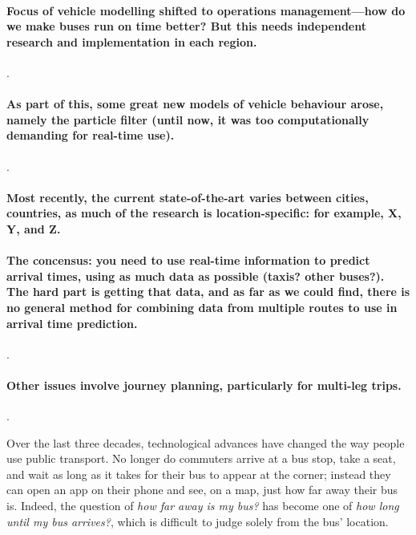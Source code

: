 \paragraph{Focus of vehicle modelling shifted to operations management---how do we make buses run on time better? But this needs independent research and implementation in each region.}
\citet{Wessel_2016, Hans_2015}.


\paragraph{As part of this, some great new models of vehicle behaviour arose, namely the particle filter (until now, it was too computationally demanding for real-time use).}
\citet{Hans_2015b,Chen_2014}.


\paragraph{Most recently, the current state-of-the-art varies between cities, countries, as much of the research is location-specific: for example, X, Y, and Z.}


\paragraph{The concensus: you need to use real-time information to predict arrival times, using as much data as possible (taxis? other buses?). The hard part is getting that data, and as far as we could find, there is no general method for combining data from multiple routes to use in arrival time prediction.}
\citet{Ma_2019,Salonen_2013,Xinghao_2013}.


\paragraph{Other issues involve journey planning, particularly for multi-leg trips.}
\citet{Horn_2004,Hame_2013a,Hame_2013b,Zheng_2016,Berczi_2017}.



\pagebreak
Over the last three decades, technological advances have changed the way people use public transport.
No longer do commuters arrive at a bus stop, take a seat,
and wait as long as it takes for their bus to appear at the corner;
instead they can open an app on their phone and see, on a map,
just how far away their bus is.
Indeed, the question of \emph{how far away is my bus?}
has become one of \emph{how long until my bus arrives?},
which is difficult to judge solely from the bus' location.


